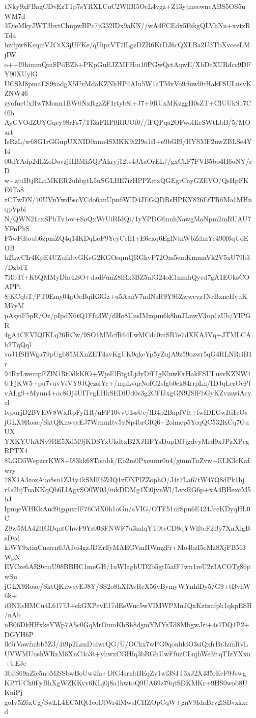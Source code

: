 tNky9xFBagCDvEzT1p7sYRXLCuC2WlBI5OcL4ygz+Z13yjmeewneABS5OS5uWM7d
3DieMkyJWT3bvtChnpwBPc7jG32IDx9aKN//wA4FCEdx5FskgQLVhNn+xvtzRTd4
bzdpw8KeqmVJCtX3jUFKe/qUipsVT7lLgzDZR6KrDJ6cQXLBa2U3TbXvcceLMjIW
o++I9himmQmSPdBZh+PKpGuEJZMFHm10PGwQctAqwE/XbDcXURdcc9DFY90XUylG
UCSM8pmaES9xadgX5UvMdaKZNhHP4AIu5W1aTMvVo9duwl0rHakFSULusvKZNW46
zyofncCxRw7Monn1BW0NxRgzZF1rtyb8i+J7+9RUxMKzggH0sZT+CIUUkS17C0Ib
AyGVOdZUYGqcy98rFs7/Tf3aFHP0RlUOf0//fFQPqa2OFwoHicSWtLbB/5/MOart
IsRzL/w68G1rGGupUXNID0ami4SMKK9i2I9o1fI+e9bGI9/HYSMF2uwZBLSe4YI4
00dYAdp2dLZoDovzjHBMh5QPAkryj12ts4JAaOrEL//gxCkF7FVB5bo4H6oNY/rD
w+zjuHtjRLnMKER2uhbgtL5nSGLHE7izHPPZrtxQGEgrCayGZEVO/QsHpFKE6Ta8
zCTwDN/70UVuYwd5scVCdo6anUpn6WlD4JEGQDRsHPKY826EfTR6Mo1MHnqpVpbi
N/QWN21cxSPhTv1ev+SoQxWrUiRIdQi/1yYPDG6nuhNawgMoNpm2mRUAU7YFnPhS
F5wFdtoub6zpmZQ4q14KDqLoF9YeyCcfH+E6cxq6EglNtnWbZdmYe490f6qUoEOB
h2LwCIr4KpE4UZufkbvGKsG2KGOsqmQRGkyP72Om5emKmmnVk2V5xU79b3/Dzb1T
7RbTf+K6QMMyDheLSO+dadFunZ8lRx3BZ5nlG24oE1nznhQycd7gA1EUksCOAPPi
8jKCqbT/PT0Emy04pOeBqiK3Gz+u5AanV7ndNsR9Y86ZwwcvzJNrBxncHvuKM7yM
pAsyiF5pR/Oz/pIpdX6tQ1Ffa3W/dHo8UnsIMxqun6k8hnJLnwV3up1zUb/YIPGR
4gA4CEVIQIKLq26RCw/9SO1MMcfR64LwMCdc0mSR7e7dXKA5Vq+JTMLCAh2TqQql
voJ1fSHWga79pUgb85MXnZET4avKgUK9qkeYp5yZujA9z59ozwr5qG4RLNRriB1r
94RxLwempFZlN1Rt0dkKfO+WjeElBtgtLjdyDfFIgKluwl0rHakFSULusvKZNW46
FjKW5+pu7vuvVsVY9JQczslYc+/mpLvqrNofG2sfgb0ek84rrpLn/IDJqLerOcPf
vALg9+Mynn4+oc8Oj4UITvgLHhSEDlUd0e3g2CFfJxgGN92SfFbGyKZvmwiAcycl
lvpurjD2BVEW8WxRpFyf1R/uFP10vvUIssUc/lD4p2BapfVft+fwfDLGwIti1cOs
jGLX9Roac/SktQKnwsyEJ7WrmnItv5yNp4brGlQ6+2oimep5YcqQC532KCq7GuUX
YXKYUhANv9RE5XdM9jKDSYxUkdtxB2XJHFYsDupDfJjgdvyMrd9xJPzXPcgRPTX4
8LGD5WepzcrKW8+I83kk68Tombk/Eb2m0Pxeumr0u4/ginmTnZvw+ELK3cKafwry
78X1A3zozAuo8su1ZJ4y4kSME6ZiIQ1zf0NPlZZophO/J4t7La67tW47Q8dPk1hj
r1s2bjTuaKKqQb6LlAgvSO0W03/iukDDMg4Xi0jvnWl/LvxEG6p+xA4BHexcM5bJ
IpnqeWHKkAud9igquxrlF76CdX0h1oGu/aVIG/OTF51nrSpn6E424JceKDyqHL0C
Z9w5MA42HGDqntChwF9Ys00SFNWF7u3mlqYT0tcCD8qYWlftcF2By7XnXigBsDyd
kiWY9xtinCnsrrn6JAJei4gzJDErffyMAEGVmHWmgFr+Mo4bzI5eMz8XjFBM3WpN
EVCze6AR9vmU08BBHC1meGH/1uWIagbUD2b5gtI5afF7wn1reU2r3ACOTg86pwSu
jGLX9Roac/SktQKnwsyEJ8Y/SS2o8hXfAvRcX56vBymyWYnhlDy5/G9+tBvhW6k+
iONEsHMCu4L6177J+ckGXPevE17dEsWuc5wVIMWPMnJQxKztznfph1qkpESH/nAb
nB06DkHHxkeYWp7A5c0GqMrOumKhSh8dgmYMYzTd8MbgwJri+4s7DQ4P2+DGYH6P
fk9rVawfmbb5Z3/4t9p2LznDuiwrQG/U/OCkx7wPG9qonhkiO3siQxfrBr3zmRvL
UVWMUushWRzM6XuC4o3t+yhwxCGHfq3bRGhUwFfuzCLnjhWe3ftqTIzYXxu+UEJc
3bJS69nZie5nbMiSSbwBoUw4fn+DfG4srnbBEqZv1wl3S4T3xJ2X435rEeF9Jswg
KP7UCh0FyBhXgWZKKvv6KLj0j8a1hwtoQ9UA69z79qtSDKMKr+9HS0wob8UKuiPj
goIv5Z6xUg/SwLL4EC5IQt1coDlWr4lMwsICHZOpCqW+gnV9IdaBrv2lSBvzkxed
